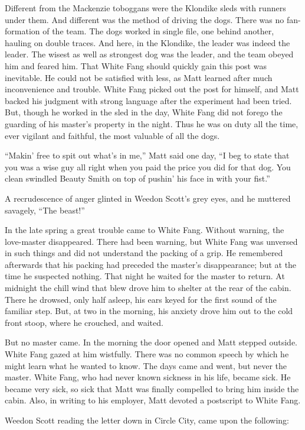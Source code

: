 \documentclass[10pt]{book}
\begin{document}
Different from the Mackenzie toboggans were the Klondike sleds with
runners under them. And different was the method of driving the dogs.
There was no fan-formation of the team. The dogs worked in single file,
one behind another, hauling on double traces. And here, in the
Klondike, the leader was indeed the leader. The wisest as well as
strongest dog was the leader, and the team obeyed him and feared him.
That White Fang should quickly gain this post was inevitable. He could
not be satisfied with less, as Matt learned after much inconvenience
and trouble. White Fang picked out the post for himself, and Matt
backed his judgment with strong language after the experiment had been
tried. But, though he worked in the sled in the day, White Fang did not
forego the guarding of his master’s property in the night. Thus he was
on duty all the time, ever vigilant and faithful, the most valuable of
all the dogs.

“Makin’ free to spit out what’s in me,” Matt said one day, “I beg to
state that you was a wise guy all right when you paid the price you did
for that dog. You clean swindled Beauty Smith on top of pushin’ his
face in with your fist.”

A recrudescence of anger glinted in Weedon Scott’s grey eyes, and he
muttered savagely, “The beast!”

In the late spring a great trouble came to White Fang. Without warning,
the love-master disappeared. There had been warning, but White Fang was
unversed in such things and did not understand the packing of a grip.
He remembered afterwards that his packing had preceded the master’s
disappearance; but at the time he suspected nothing. That night he
waited for the master to return. At midnight the chill wind that blew
drove him to shelter at the rear of the cabin. There he drowsed, only
half asleep, his ears keyed for the first sound of the familiar step.
But, at two in the morning, his anxiety drove him out to the cold front
stoop, where he crouched, and waited.

But no master came. In the morning the door opened and Matt stepped
outside. White Fang gazed at him wistfully. There was no common speech
by which he might learn what he wanted to know. The days came and went,
but never the master. White Fang, who had never known sickness in his
life, became sick. He became very sick, so sick that Matt was finally
compelled to bring him inside the cabin. Also, in writing to his
employer, Matt devoted a postscript to White Fang.

Weedon Scott reading the letter down in Circle City, came upon the
following:
\end{document}
